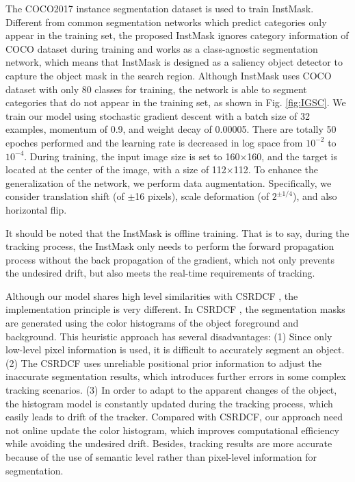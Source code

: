 \documentclass[review]{elsarticle}
\begin{document}
\begin{CJK*}{UTF8}{gbsn}
The COCO2017 \cite{Lin2014MicrosoftCC} instance segmentation dataset is used to train InstMask.
Different from common segmentation networks which predict categories only appear in the training set, the proposed InstMask ignores category information of COCO dataset during training and works as a class-agnostic segmentation network, which means that InstMask is designed as a saliency object detector to capture the object mask in the search region. Although InstMask uses COCO dataset \cite{Lin2014MicrosoftCC} with only 80 classes for training, the network is able to segment categories that do not appear in the training set, as shown in Fig. \ref{fig:IGSC}.
We train our model using stochastic gradient descent with a batch size of 32 examples, momentum of 0.9, and weight decay of 0.00005. There are totally 50 epoches performed and the learning rate is decreased in log space from $10^{-2}$ to $10^{-4}$. During training, the input image size is set to 160$\times$160, and the target is located at the center of the image, with a size of 112$\times$112. To enhance the generalization of the network, we perform data augmentation. Specifically, we consider translation shift (of $\pm$16 pixels), scale deformation (of $2^{\pm 1/4}$), and also horizontal flip.

It should be noted that the InstMask is offline training. That is to say, during the tracking process, the InstMask only needs to perform the forward propagation process without the back propagation of the gradient, which not only prevents the undesired drift, but also meets the real-time requirements of tracking.

Although our model shares high level similarities with CSRDCF \cite{Lukezic2017DiscriminativeCF}, the implementation principle is very different.
In CSRDCF \cite{Lukezic2017DiscriminativeCF}, the segmentation masks are generated using the color histograms of the object foreground and background. This heuristic approach has several disadvantages: (1) Since only low-level pixel information is used, it is difficult to accurately segment an object. (2) The CSRDCF uses unreliable positional prior information to adjust the inaccurate segmentation results, which introduces further errors in some complex tracking scenarios. (3) In order to adapt to the apparent changes of the object, the histogram model is constantly updated during the tracking process, which easily leads to drift of the tracker. 
Compared with CSRDCF, our approach need not online update the color histogram, which improves computational efficiency while avoiding the undesired drift. Besides, tracking results are more accurate because of the use of semantic level rather than pixel-level information for segmentation.


\end{CJK*}
\end{document}
